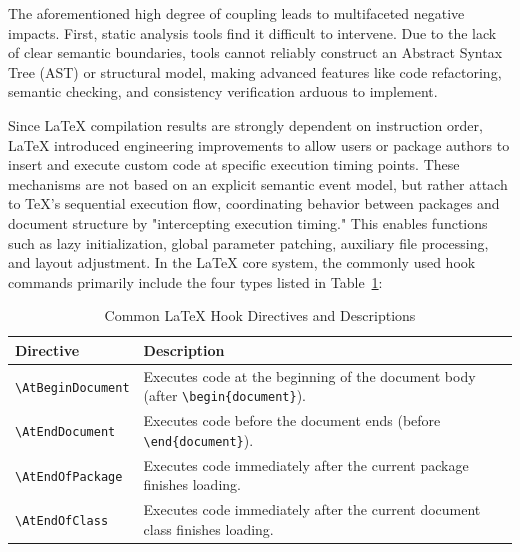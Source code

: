 The aforementioned high degree of coupling leads to multifaceted negative impacts. First, static analysis tools find it difficult to intervene. Due to the lack of clear semantic boundaries, tools cannot reliably construct an Abstract Syntax Tree (AST) or structural model, making advanced features like code refactoring, semantic checking, and consistency verification arduous to implement.

Since \LaTeX{} compilation results are strongly dependent on instruction order, \LaTeX{} introduced engineering improvements to allow users or package authors to insert and execute custom code at specific execution timing points. These mechanisms are not based on an explicit semantic event model, but rather attach to \TeX{}'s sequential execution flow, coordinating behavior between packages and document structure by "intercepting execution timing." This enables functions such as lazy initialization, global parameter patching, auxiliary file processing, and layout adjustment. In the \LaTeX{} core system, the commonly used hook commands primarily include the four types listed in Table~\ref{tab:latex-hooks}:

\begin{table}[htbp]
  \centering\textit{}
  \small
  \setlength{\tabcolsep}{3pt}
  \caption{Common \LaTeX{} Hook Directives and Descriptions}
  \label{tab:latex-hooks}
  \begin{tabular}{p{2.8cm}p{4.0cm}}
    \toprule
    \textbf{Directive}                      & \textbf{Description}                                                                                   \\
    \midrule
    \texttt{\textbackslash AtBeginDocument} & Executes code at the beginning of the document body (after \texttt{\textbackslash begin\{document\}}). \\
    \texttt{\textbackslash AtEndDocument}   & Executes code before the document ends (before \texttt{\textbackslash end\{document\}}).               \\
    \texttt{\textbackslash AtEndOfPackage}  & Executes code immediately after the current package finishes loading.                                  \\
    \texttt{\textbackslash AtEndOfClass}    & Executes code immediately after the current document class finishes loading.                           \\
    \bottomrule
  \end{tabular}
\end{table}

